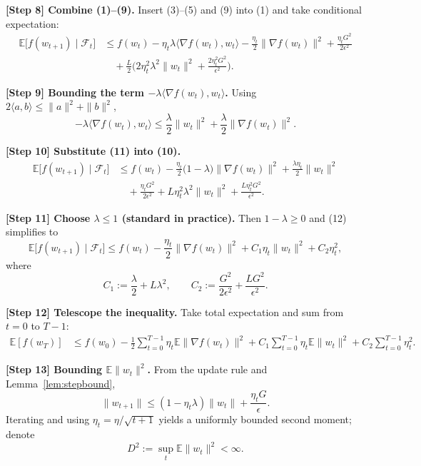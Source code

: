 \documentclass{article}
\begin{document}
\bigskip
\noindent\textbf{[Step 8] Combine (1)–(9).}
Insert (3)–(5) and (9) into (1) and take conditional expectation:
\[
\begin{aligned}
\mathbb{E}\big[f(w_{t+1})\mid\mathcal{F}_t\big]
&\le f(w_t)
-\eta_t\lambda\langle\nabla f(w_t),w_t\rangle
-\frac{\eta_t}{2}\|\nabla f(w_t)\|^2
+\frac{\eta_t G^2}{2\epsilon^2}\\
&\quad +\frac{L}{2}\Big(2\eta_t^2\lambda^2\|w_t\|^2
+\frac{2\eta_t^2 G^2}{\epsilon^2}\Big).
\end{aligned}
\tag{10}
\]

\bigskip
\noindent\textbf{[Step 9] Bounding the term $-\lambda\langle\nabla f(w_t),w_t\rangle$.}
Using $2\langle a,b\rangle\le \|a\|^2+\|b\|^2$,
\[
-\lambda\langle\nabla f(w_t),w_t\rangle
\le \frac{\lambda}{2}\|w_t\|^2+\frac{\lambda}{2}\|\nabla f(w_t)\|^2 .
\tag{11}
\]

\bigskip
\noindent\textbf{[Step 10] Substitute (11) into (10).}
\[
\begin{aligned}
\mathbb{E}\big[f(w_{t+1})\mid\mathcal{F}_t\big]
&\le f(w_t)
-\frac{\eta_t}{2}\big(1-\lambda\big)\|\nabla f(w_t)\|^2
+\frac{\lambda\eta_t}{2}\|w_t\|^2\\
&\quad +\frac{\eta_t G^2}{2\epsilon^2}
+L\eta_t^2\lambda^2\|w_t\|^2
+\frac{L\eta_t^2 G^2}{\epsilon^2}.
\end{aligned}
\tag{12}
\]

\bigskip
\noindent\textbf{[Step 11] Choose $\lambda\le 1$ (standard in practice).}
Then $1-\lambda\ge 0$ and (12) simplifies to
\[
\mathbb{E}\big[f(w_{t+1})\mid\mathcal{F}_t\big]
\le f(w_t)
-\frac{\eta_t}{2}\|\nabla f(w_t)\|^2
+C_1\eta_t\|w_t\|^2+C_2\eta_t^2 ,
\tag{13}
\]
where
\[
C_1:=\frac{\lambda}{2}+L\lambda^2,\qquad
C_2:=\frac{G^2}{2\epsilon^2}+ \frac{LG^2}{\epsilon^2}.
\]

\bigskip
\noindent\textbf{[Step 12] Telescope the inequality.}
Take total expectation and sum from $t=0$ to $T-1$:
\[
\begin{aligned}
\mathbb{E}[f(w_T)] &\le f(w_0)
-\frac{1}{2}\sum_{t=0}^{T-1}\eta_t\mathbb{E}\|\nabla f(w_t)\|^2
+ C_1\sum_{t=0}^{T-1}\eta_t\mathbb{E}\|w_t\|^2
+ C_2\sum_{t=0}^{T-1}\eta_t^2 .
\end{aligned}
\tag{14}
\]

\bigskip
\noindent\textbf{[Step 13] Bounding $\mathbb{E}\|w_t\|^2$.}
From the update rule and Lemma~\ref{lem:stepbound},
\[
\|w_{t+1}\| \le (1-\eta_t\lambda)\|w_t\| + \frac{\eta_t G}{\epsilon}.
\]
Iterating and using $\eta_t=\eta/\sqrt{t+1}$ yields a uniformly bounded second moment; denote
\[
D^2:=\sup_{t}\mathbb{E}\|w_t\|^2 <\infty .
\tag{15}
\]
\end{document}
